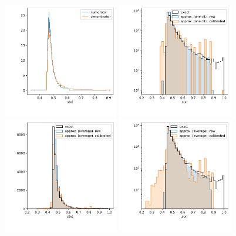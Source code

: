 \begin{figure}
  \includegraphics[width=0.45\textwidth]{figures/appendix/pointwise_tuning_full/calibration_histos_one_smart_rf_var_binwidth.pdf}%
  \includegraphics[width=0.45\textwidth]{figures/appendix/pointwise_tuning_full/s_histos_one_log_smart_rf_var_binwidth.pdf}\\%
  \includegraphics[width=0.45\textwidth]{figures/appendix/pointwise_tuning_full/s_histos_average_smart_rf_var_binwidth.pdf}%
  \includegraphics[width=0.45\textwidth]{figures/appendix/pointwise_tuning_full/s_histos_average_log_smart_rf_var_binwidth.pdf}%

\end{figure}
